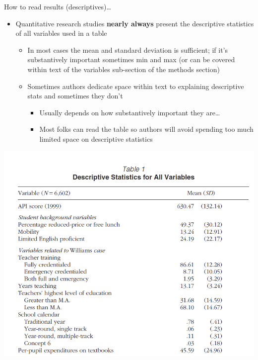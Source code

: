 \documentclass[
  8pt,
  ignorenonframetext,
  dvipsnames]{beamer}
\providecommand{\tightlist}{%
  \setlength{\itemsep}{0pt}\setlength{\parskip}{0pt}}
\renewcommand{\textbf}[1]{{\color{darkgray}\bfseries\fontfamily{Montserrat-TOsF}#1}}
\let\olditem\item
\renewcommand{\item}{%
  \olditem\vspace{4pt}
}
\begin{document}
\begin{frame}{How to read results (descriptives)\ldots{}}
\protect\hypertarget{how-to-read-results-descriptives}{}

\begin{itemize}
\tightlist
\item
  Quantitative research studies \textbf{nearly always} present the
  descriptive statistics of all variables used in a table

  \begin{itemize}
  \tightlist
  \item
    In most cases the mean and standard deviation is sufficient; if it's
    substantively important sometimes min and max (or can be covered
    within text of the variables sub-section of the methods section)
  \item
    Sometimes authors dedicate space within text to explaining
    descriptive stats and sometimes they don't

    \begin{itemize}
    \tightlist
    \item
      Usually depends on how substantively important they are\ldots{}
    \item
      Most folks can read the table so authors will avoid spending too
      much limited space on descriptive statistics
    \end{itemize}
  \end{itemize}
\end{itemize}

\includegraphics{powers_table1.png}

\end{frame}
\end{document}
